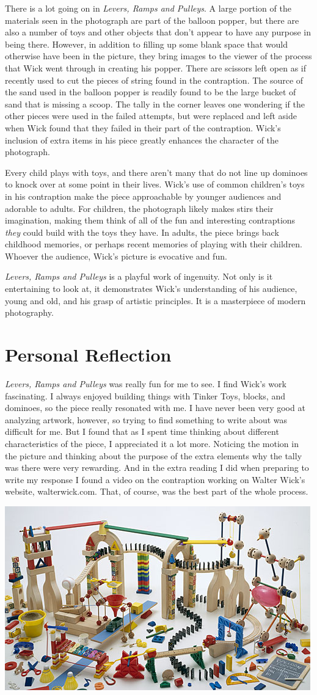 \documentclass[onecolumn, 12pt]{article}
\begin{document}
There is a lot going on in \emph{Levers, Ramps and Pulleys}.  A large portion
of the materials seen in the photograph are part of the balloon popper, but
there are also a number of toys and other objects that don't appear to have any
purpose in being there.  However, in addition to filling up some blank space
that would otherwise have been in the picture, they bring images to the viewer
of the process that Wick went through in creating his popper.  There are
scissors left open as if recently used to cut the pieces of string found in the
contraption.  The source of the sand used in the balloon popper is readily
found to be the large bucket of sand that is missing a scoop.  The tally in the
corner leaves one wondering if the other pieces were used in the failed
attempts, but were replaced and left aside when Wick found that they failed in
their part of the contraption.  Wick's inclusion of extra items in his piece
greatly enhances the character of the photograph.

Every child plays with toys, and there aren't many that do not line up dominoes
to knock over at some point in their lives.  Wick's use of common children's
toys in his contraption make the piece approachable by younger audiences and
adorable to adults.  For children, the photograph likely makes stirs their
imagination, making them think of all of the fun and interesting contraptions
\emph{they} could build with the toys they have.  In adults, the piece brings
back childhood memories, or perhaps recent memories of playing with their
children.  Whoever the audience, Wick's picture is evocative and fun.

\emph{Levers, Ramps and Pulleys} is a playful work of ingenuity.  Not only is
it entertaining to look at, it demonstrates Wick's understanding of his
audience, young and old, and his grasp of artistic principles.  It is a
masterpiece of modern photography.

\section*{Personal Reflection}

\emph{Levers, Ramps and Pulleys} was really fun for me to see.  I find Wick's
work fascinating.  I always enjoyed building things with Tinker Toys, blocks,
and dominoes, so the piece really resonated with me.  I have never been very
good at analyzing artwork, however, so trying to find something to write about
was difficult for me.  But I found that as I spent time thinking about
different characteristics of the piece, I appreciated it a lot more.  Noticing
the motion in the picture and thinking about the purpose of the extra elements
why the tally was there were very rewarding.  And in the extra reading I did
when preparing to write my response I found a video on the contraption working
on Walter Wick's website, walterwick.com.  That, of course, was the best part
of the whole process.

\begin{center}
  \includegraphics[width=.5\textwidth]{levers.jpg}
\end{center}
\end{document}
